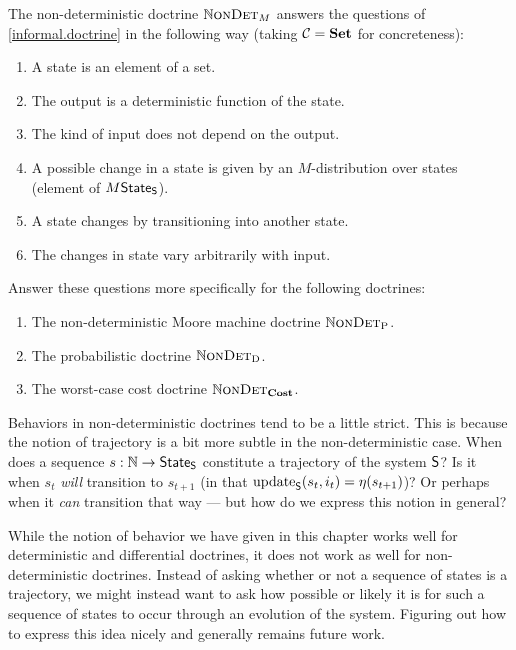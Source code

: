 \documentclass[DynamicalBook]{subfiles}
\begin{document}
The non-deterministic doctrine $\mathbb{N}\textsc{onDet}_M$ answers the questions of
\cref{informal.doctrine} in the following way (taking $\mathcal{C} = \textbf{Set}$ for concreteness):
\begin{enumerate}
  \item A state is an element of a set.
  \item The output is a deterministic function of the state.
  \item The kind of input does not depend on the output. 
  \item A possible change in a state is given by an $M$-distribution over states
    (element of
    $M\mathsf{State}_{\mathsf{S}}$).
  \item A state changes by transitioning into another state. 
  \item The changes in state vary arbitrarily with input.
\end{enumerate}

\begin{exercise}
Answer these questions more specifically for the following doctrines:
\begin{enumerate}
  \item The non-deterministic Moore machine doctrine $\mathbb{N}\textsc{onDet}_{\mathrm{P}}$.
  \item The probabilistic doctrine $\mathbb{N}\textsc{onDet}_{\mathrm{D}}$.
\item The worst-case cost doctrine $\mathbb{N}\textsc{onDet}_{\textbf{Cost}}$.
\end{enumerate}
\end{exercise}

Behaviors in non-deterministic doctrines tend to be a little strict. This is
because the notion of trajectory is a bit more subtle in the non-deterministic
case. When does a sequence $s : \mathbb{N} \to \mathsf{State}_{\mathsf{S}}$ constitute a trajectory of
the system $\mathsf{S}$? Is it when $s_t$ \emph{will} transition to $s_{t +1}$ (in
that $\mathrm{update}_{\mathsf{S}}(s_t, i_t) = \eta(s_{t+ 1})$)? Or perhaps when it \emph{can}
transition that way --- but how do we express this notion in general?

While the notion of behavior we have given in this chapter works well for
deterministic and differential doctrines, it does not work as well for
non-deterministic doctrines. Instead of asking whether or not a sequence of
states is a trajectory, we might instead want to ask how possible or likely it is
for such a sequence of states to occur through an evolution of the system.
Figuring out how to express this idea nicely and generally remains future work.
\end{document}

